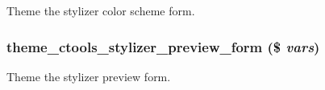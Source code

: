 Theme the stylizer color scheme form. \hypertarget{includes_2stylizer_8inc_ac11c0cb46ff3730fc4beb56a6e1f15c9}{
\subsubsection[{theme\_\-ctools\_\-stylizer\_\-preview\_\-form}]{\setlength{\rightskip}{0pt plus 5cm}theme\_\-ctools\_\-stylizer\_\-preview\_\-form (\$ {\em vars})}}
\label{includes_2stylizer_8inc_ac11c0cb46ff3730fc4beb56a6e1f15c9}
Theme the stylizer preview form. 